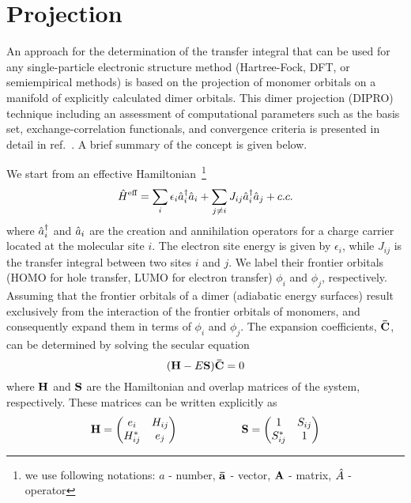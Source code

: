\section{Projection}
\label{sec:dipro}
An approach for the determination of the transfer integral that can be used for any single-particle electronic structure method (Hartree-Fock, DFT, or semiempirical methods) is based on the projection of monomer orbitals on a manifold of explicitly calculated dimer orbitals. This dimer projection (DIPRO) technique including an assessment of computational parameters such as the basis set, exchange-correlation functionals, and convergence criteria is presented in detail in ref.~\cite{baumeier_density-functional_2010}. A brief summary of the concept is given below.

We start from an effective Hamiltonian~\footnote{we use following notations: $a$ - number, $\mathbf{ \bar{a} }$ - vector, $\mathbf{ A }$ - matrix, $\hat{ A }$ - operator}
%
\begin{equation}
  \hat{ H }^\text{eff} = \sum_i \epsilon_i \hat{ a }_i^\dagger \hat{ a }_i + \sum_{j \neq i} J_{ij} \hat{ a }_i^\dagger \hat{ a }_j + c.c.
  \label{equ:dipro_eq1}
\end{equation}
%
where $\hat{ a }_i^\dagger$ and $\hat{ a }_i$ are the creation and annihilation operators for a charge carrier located at the molecular site $i$.
The electron site energy is given by $\epsilon_i$, while $J_{ij}$  is the transfer integral between two sites $i$ and $j$. We label their frontier orbitals (HOMO for hole transfer, LUMO for electron transfer) $\phi_i$ and $\phi_j$, respectively. Assuming that the frontier orbitals of a dimer (adiabatic energy surfaces) result exclusively from the interaction of the frontier orbitals of monomers, and consequently expand them in terms of $\phi_i$ and $\phi_j$. The expansion coefficients, $\mathbf{ \bar{C} }$, can be determined by solving the secular equation
%
\begin{equation}
  (\mathbf{ H } - E \mathbf{ S })\mathbf{ \bar{C} } = 0
  \label{equ:dipro_eq2}
\end{equation}
%
where $\mathbf{ H }$ and $\mathbf{ S }$ are the Hamiltonian and overlap matrices of the system, respectively. 
%
%
%
These matrices can be written explicitly as
%
\begin{equation}
  \mathbf{ H } = 
  \begin{pmatrix}
    e_i    &  H_{ij} \\
    H_{ij}^* &  e_j  
  \end{pmatrix} \hspace{2cm}
  \mathbf{ S } = 
  \begin{pmatrix}
    1    &  S_{ij} \\
    S_{ij}^* &  1  
  \end{pmatrix}
  \label{equ:dipro_eq3}
\end{equation}
